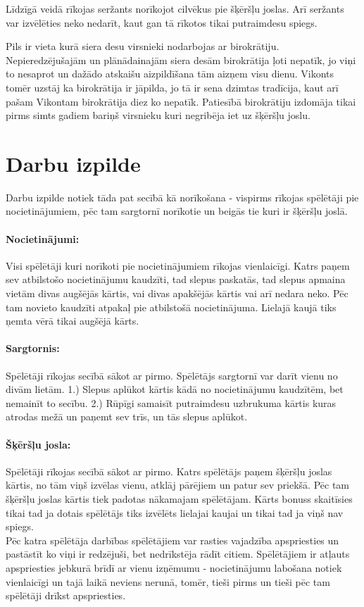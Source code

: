 \documentclass[11pt,a4paper,titlepage]{article}
\begin{document}
Līdzīgā veidā rīkojas seržants norīkojot cilvēkus pie šķēršļu joslas. Arī seržants var izvēlēties neko nedarīt, kaut 
gan tā rīkotos tikai putraimdesu spiegs.

{Pils ir vieta kurā siera desu virsnieki nodarbojas ar birokrātiju. Nepieredzējušajām un plānādainajām siera desām
birokrātija ļoti nepatīk, jo viņi to nesaprot un dažādo atskaišu aizpildīšana tām aizņem visu dienu. Vikonts
tomēr uzstāj ka birokrātija ir jāpilda, jo tā ir sena dzimtas tradīcija, kaut arī pašam Vikontam birokrātija diez ko
nepatīk. Patiesībā birokrātiju izdomāja tikai pirms simts gadiem bariņš virsnieku kuri negribēja iet uz šķēršļu joslu.}

\section*{Darbu izpilde}
Darbu izpilde notiek tāda pat secībā kā norīkošana - vispirms rīkojas spēlētāji pie nocietinājumiem, pēc tam sargtornī
norīkotie un beigās tie kuri ir šķēršļu joslā.
  \paragraph*{Nocietinājumi: } Visi spēlētāji kuri norīkoti pie nocietinājumiem rīkojas vienlaicīgi. Katrs paņem sev
  atbilstošo nocietinājumu kaudzīti, tad slepus paskatās, tad slepus apmaina vietām divas augšējās kārtis, vai
  divas apakšējās kārtis vai arī nedara neko. Pēc tam novieto kaudzīti atpakaļ pie atbilstošā nocietinājuma.
  Lielajā kaujā tiks ņemta vērā tikai augšējā kārts.
  \paragraph*{Sargtornis: } Spēlētāji rīkojas secībā sākot ar pirmo. Spēlētājs sargtornī var darīt vienu no divām lietām.
  1.) Slepus aplūkot kārtis kādā no nocietinājumu kaudzītēm, bet nemainīt to secību.
  2.) Rūpīgi samaisīt putraimdesu uzbrukuma kārtis kuras atrodas mežā un paņemt sev trīs, un tās slepus aplūkot.
  \paragraph*{Šķēršļu josla: } Spēlētāji rīkojas secībā sākot ar pirmo. Katrs spēlētājs paņem šķēršļu joslas kārtis, 
  no tām viņš izvēlas vienu, atklāj pārējiem 
  un patur sev priekšā. Pēc tam šķēršļu joslas kārtis tiek padotas 
  nākamajam spēlētājam. Kārts bonuss skaitīsies tikai tad ja dotais spēlētājs
  tiks izvēlēts lielajai kaujai un tikai tad ja viņš nav spiegs.
\\
Pēc katra spēlētāja darbības spēlētājiem var rasties vajadzība apspriesties un pastāstīt ko viņi ir redzējuši, bet 
nedrīkstēja rādīt citiem. Spēlētājiem ir atļauts apspriesties jebkurā brīdī ar vienu izņēmumu - nocietinājumu 
labošana notiek vienlaicīgi un tajā laikā neviens nerunā, tomēr, tieši pirms un tieši pēc tam spēlētāji drīkst 
apspriesties.
\end{document}
